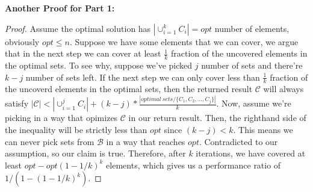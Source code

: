 \documentclass[11pt]{article}
\begin{document}
\begin{enumerate}
\newpage

{\bf Another Proof for Part 1: }
\begin{proof}
	\noindent Assume the optimal solution has $|\cup_{i=1}^{k}C_i| = opt$ number of elements, obviously $opt \leq n$.
	Suppose we have some elements that we can cover, we argue that in the next step we can cover at least $\frac{1}{k}$ fraction of the uncovered elements in the optimal sets.
	To see why, suppose we've picked $j$ number of sets and there're $k-j$ number of sets left.
	If the next step we can only cover less than $\frac{1}{k}$ fraction of the uncoverd elements in the optimal sets, then the returned result $\mathcal{C}$ will always satisfy $|\mathcal{C}| < |\cup_{i=1}^{j}C_i| + (k-j) * \frac{|optimal~sets/\{C_1, C_2, \dots, C_j\}|}{k}$.
	Now, assume we're picking in a way that opimizes $\mathcal{C}$ in our return result.
	Then, the righthand side of the inequality will be strictly less than $opt$ since $(k-j) < k$.
	This means we can never pick sets from $\mathcal{B}$ in a way that reaches $opt$.
	Contradicted to our assumption, so our claim is true.
	Therefore, after $k$ iterations, we have covered at least $opt - opt(1 - 1/k)^k$ elements, which gives us a performance ratio of $1/(1 - (1 - 1/k)^k)$.
\end{proof}

\newpage


\end{enumerate}
\end{document}
